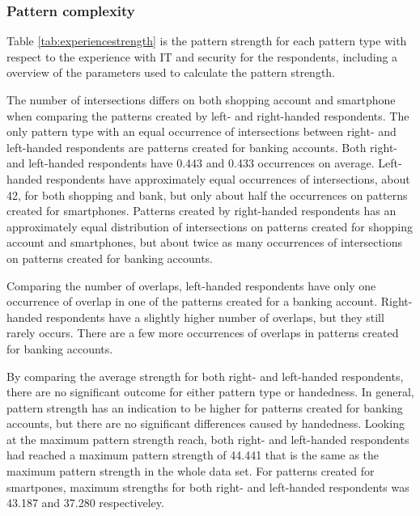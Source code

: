     \subsubsection{Pattern complexity}

      Table \ref{tab:experiencestrength} is the pattern strength for each pattern type with respect to the experience with IT and security for the respondents, including a overview of the parameters used to calculate the pattern strength. 












      The number of intersections differs on both shopping account and smartphone when comparing the patterns created by left- and right-handed respondents. The only pattern type with an equal occurrence of intersections between right- and left-handed respondents are patterns created for banking accounts. Both right- and left-handed respondents have 0.443 and 0.433 occurrences on average. Left-handed respondents have approximately equal occurrences of intersections, about 42, for both shopping and bank, but only about half the occurrences on patterns created for smartphones. Patterns created by right-handed respondents has an approximately equal distribution of intersections on patterns created for shopping account and smartphones, but about twice as many occurrences of intersections on patterns created for banking accounts.

      Comparing the number of overlaps, left-handed respondents have only one occurrence of overlap in one of the patterns created for a banking account. Right-handed respondents have a slightly higher number of overlaps, but they still rarely occurs. There are a few more occurrences of overlaps in patterns created for banking accounts. 

      By comparing the average strength for both right- and left-handed respondents, there are no significant outcome for either pattern type or handedness. In general, pattern strength has an indication to be higher for patterns created for banking accounts, but there are no significant differences caused by handedness. Looking at the maximum pattern strength reach, both right- and left-handed respondents had reached a maximum pattern strength of 44.441 that is the same as the maximum pattern strength in the whole data set. For patterns created for smartpones, maximum strengths for both right- and left-handed respondents was 43.187 and 37.280 respectiveley. 

